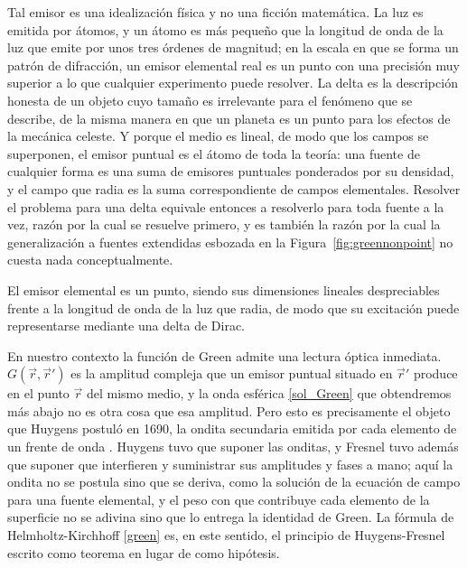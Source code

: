 		Tal emisor es una idealización física y no una ficción matemática. La luz es emitida por átomos, y un átomo es más pequeño que la longitud de onda de la luz que emite por unos tres órdenes de magnitud; en la escala en que se forma un patrón de difracción, un emisor elemental real es un punto con una precisión muy superior a lo que cualquier experimento puede resolver. La delta es la descripción honesta de un objeto cuyo tamaño es irrelevante para el fenómeno que se describe, de la misma manera en que un planeta es un punto para los efectos de la mecánica celeste. Y porque el medio es lineal, de modo que los campos se superponen, el emisor puntual es el átomo de toda la teoría: una fuente de cualquier forma es una suma de emisores puntuales ponderados por su densidad, y el campo que radia es la suma correspondiente de campos elementales. Resolver el problema para una delta equivale entonces a resolverlo para toda fuente a la vez, razón por la cual se resuelve primero, y es también la razón por la cual la generalización a fuentes extendidas esbozada en la Figura~\ref{fig:greennonpoint} no cuesta nada conceptualmente.

		\begin{Assumption}
			El emisor elemental es un punto, siendo sus dimensiones lineales despreciables frente a la longitud de onda de la luz que radia, de modo que su excitación puede representarse mediante una delta de Dirac.
		\end{Assumption}


		En nuestro contexto la función de Green admite una lectura óptica inmediata. $G(\vec{r},\vec{r}')$ es la amplitud compleja que un emisor puntual situado en $\vec{r}'$ produce en el punto $\vec{r}$ del mismo medio, y la onda esférica \eqref{sol_Green} que obtendremos más abajo no es otra cosa que esa amplitud. Pero esto es precisamente el objeto que Huygens postuló en 1690, la ondita secundaria emitida por cada elemento de un frente de onda \citep{huygens1690traite}. Huygens tuvo que suponer las onditas, y Fresnel tuvo además que suponer que interfieren y suministrar sus amplitudes y fases a mano; aquí la ondita no se postula sino que se deriva, como la solución de la ecuación de campo para una fuente elemental, y el peso con que contribuye cada elemento de la superficie no se adivina sino que lo entrega la identidad de Green. La fórmula de Helmholtz-Kirchhoff \eqref{green} es, en este sentido, el principio de Huygens-Fresnel escrito como teorema en lugar de como hipótesis.

